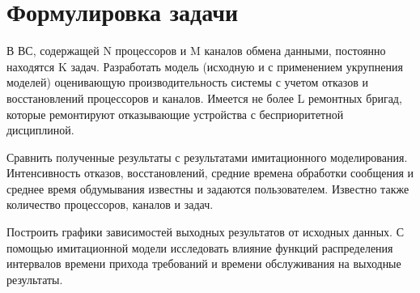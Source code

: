 \section{Формулировка задачи}

В ВС, содержащей N процессоров и M каналов обмена данными, постоянно находятся K задач. Разработать модель (исходную и с применением укрупнения моделей) оценивающую производительность системы с учетом отказов и восстановлений процессоров и каналов. Имеется не более L ремонтных бригад, которые ремонтируют отказывающие устройства с бесприоритетной дисциплиной. 

Сравнить полученные результаты с результатами имитационного моделирования. Интенсивность отказов, восстановлений, средние времена обработки сообщения и среднее время обдумывания известны и задаются пользователем. Известно также количество процессоров, каналов и задач.

Построить графики зависимостей выходных результатов от исходных данных. С помощью имитационной модели исследовать влияние функций распределения интервалов времени прихода требований и времени обслуживания на выходные результаты.

